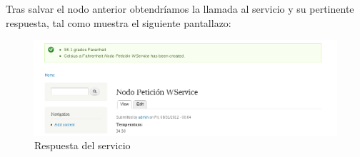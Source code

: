 Tras salvar el nodo anterior obtendríamos la llamada al servicio y su pertinente respuesta, tal como muestra 
el siguiente pantallazo:

\begin{figure}[h]
  \centering
    \includegraphics[width=1\textwidth]{Assets/Soap/Imagenes/resultado_crear_nodo.png}
  \caption{Respuesta del servicio}
\end{figure}





